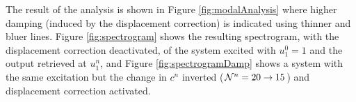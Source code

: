 The result of the analysis is shown in Figure \ref{fig:modalAnalysis} where higher damping (induced by the displacement correction) is indicated using thinner and bluer lines. Figure \ref{fig:spectrogram} shows the resulting spectrogram, with the displacement correction deactivated, of the system excited with $u_1^0 = 1$ and the output retrieved at $u_1^n$, and Figure \ref{fig:spectrogramDamp} shows a system with the same excitation but the change in $c^n$ inverted ($\mathcal{N}^n=20\rightarrow 15$) and displacement correction activated.

\begin{figure}[ht!]
    \centering
    \\
    \vspace{-1em}\\
    \vspace{-1em}

\end{figure}
